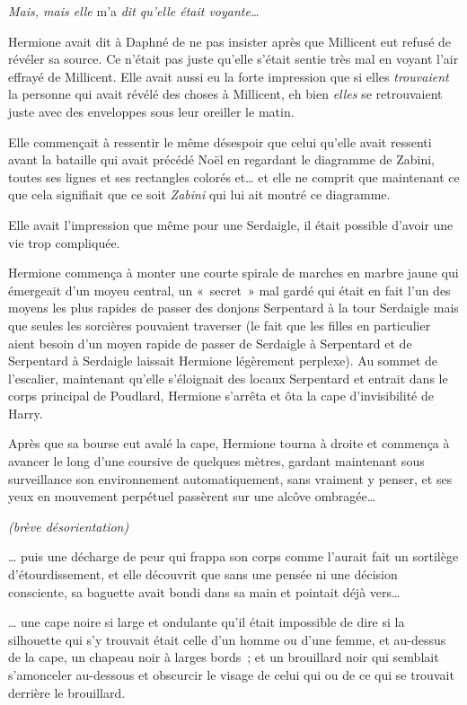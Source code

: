 \emph{Mais, mais elle} m'a \emph{dit qu'elle était voyante…}

Hermione avait dit à Daphné de ne pas insister après que Millicent eut refusé de révéler sa source.
Ce n'était pas juste qu'elle s'était sentie très mal en voyant l'air effrayé de Millicent.
Elle avait aussi eu la forte impression que si elles \emph{trouvaient} la personne qui avait révélé des choses à Millicent, eh bien \emph{elles} se retrouvaient juste avec des enveloppes sous leur oreiller le matin.

Elle commençait à ressentir le même désespoir que celui qu'elle avait ressenti avant la bataille qui avait précédé Noël en regardant le diagramme de Zabini, toutes ses lignes et ses rectangles colorés et… et elle ne comprit que maintenant ce que cela signifiait que ce soit \emph{Zabini} qui lui ait montré ce diagramme.

Elle avait l'impression que même pour une Serdaigle, il était possible d'avoir une vie trop compliquée.

Hermione commença à monter une courte spirale de marches en marbre jaune qui émergeait d'un moyeu central, un «~secret~» mal gardé qui était en fait l'un des moyens les plus rapides de passer des donjons Serpentard à la tour Serdaigle mais que seules les sorcières pouvaient traverser (le fait que les filles en particulier aient besoin d'un moyen rapide de passer de Serdaigle à Serpentard et de Serpentard à Serdaigle laissait Hermione légèrement perplexe).
Au sommet de l'escalier, maintenant qu'elle s'éloignait des locaux Serpentard et entrait dans le corps principal de Poudlard, Hermione s'arrêta et ôta la cape d'invisibilité de Harry.

Après que sa bourse eut avalé la cape, Hermione tourna à droite et commença à avancer le long d'une coursive de quelques mètres, gardant maintenant sous surveillance son environnement automatiquement, sans vraiment y penser, et ses yeux en mouvement perpétuel passèrent sur une alcôve ombragée…

\emph{(brève désorientation)}

… puis une décharge de peur qui frappa son corps comme l'aurait fait un sortilège d'étourdissement, et elle découvrit que sans une pensée ni une décision consciente, sa baguette avait bondi dans sa main et pointait déjà vers…

… une cape noire si large et ondulante qu'il était impossible de dire si la silhouette qui s'y trouvait était celle d'un homme ou d'une femme, et au-dessus de la cape, un chapeau noir à larges bords~; et un brouillard noir qui semblait s'amonceler au-dessous et obscurcir le visage de celui qui ou de ce qui se trouvait derrière le brouillard.


